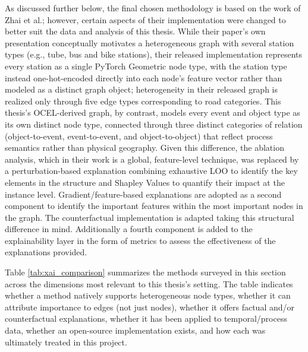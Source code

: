         As discussed further below, the final chosen methodology is based on the work of Zhai et al.\cite{zhai2025}; however, certain aspects of their implementation were changed to better suit the data and analysis of this thesis. While their paper's own presentation conceptually motivates a heterogeneous graph with several station types (e.g., tube, bus and bike stations), their released implementation \cite{zhai2025} represents every station as a single PyTorch Geometric node type, with the station type instead one-hot-encoded directly into each node's feature vector rather than modeled as a distinct graph object; heterogeneity in their released graph is realized only through five edge types corresponding to road categories. This thesis's OCEL-derived graph, by contrast, models every event and object type as its own distinct node type, connected through three distinct categories of relation (object-to-event, event-to-event, and object-to-object) that reflect process semantics rather than physical geography.
        Given this difference, the ablation analysis, which in their work is a global, feature-level technique, was replaced by a perturbation-based explanation combining exhaustive LOO to identify the key elements in the structure and Shapley Values to quantify their impact at the instance level. Gradient/feature-based explanations are adopted as a second component to identify the important features within the most important nodes in the graph. The counterfactual implementation is adapted taking this structural difference in mind. Additionally a fourth component is added to the explainability layer in the form of metrics to assess the effectiveness of the explanations provided.

        Table \ref{tab:xai_comparison} summarizes the methods surveyed in this section across the dimensions most relevant to this thesis's setting. The table indicates whether a method natively supports heterogeneous node types, whether it can attribute importance to edges (not just nodes), whether it offers factual and/or counterfactual explanations, whether it has been applied to temporal/process data, whether an open-source implementation exists, and how each was ultimately treated in this project.

